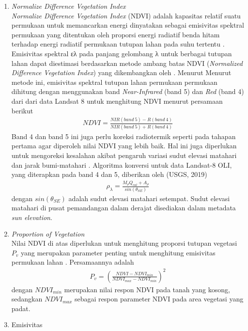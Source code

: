 \begin{enumerate}
	\vskip 5pt
	\item \textit{Normalize Difference Vegetation Index}\\
	\textit{Normalize Difference Vegetation Index} (NDVI) adalah kapasitas relatif suatu permukaan untuk memancarkan energi dinyatakan sebagai emisivitas spektral permukaan yang ditentukan oleh proporsi energi radiatif benda hitam terhadap energi radiatif permukaan tutupan lahan pada suhu tertentu \citep{Ogunode}. Emisivitas spektral ελ pada panjang gelombang λ untuk berbagai tutupan lahan dapat diestimasi berdasarkan metode ambang batas NDVI (\textit{Normalized Difference Vegetation Index}) yang dikembangkan oleh \citep{SobrinoandJimenezMunoz}. Menurut Menurut metode ini, emisivitas spektral tutupan lahan permukaan permukaan dihitung dengan menggunakan band \textit{Near-Infrared} (band 5) dan \textit{Red }(band 4) dari dari data Landsat 8 untuk menghitung NDVI menurut persamaan berikut
	\begin{align}
		NDVI = \frac{NIR(band\ 5)-R(band\ 4)}{NIR(band\ 5)+R(band\ 4)}
	\end{align}
	Band 4 dan band 5 ini juga perlu koreksi radiotermik seperti pada tahapan pertama agar diperoleh nilai NDVI yang lebih baik. Hal ini juga diperlukan untuk mengoreksi kesalahan akibat pengaruh variasi sudut elevasi matahari dan jarak bumi-matahari \citep{SekertekinArslan}. Algoritma konversi untuk data Landsat-8 OLI, yang diterapkan pada band 4 dan 5, diberikan oleh (USGS, 2019) 
	\begin{align}
		\rho_{\lambda}=\frac{M_{\rho}Q_{cal}+A_{\rho}}{sin(\theta_{SE})}
	\end{align}
	dengan $sin(\theta_{SE})$ adalah sudut elevasi matahari setempat. Sudut elevasi matahari di pusat pemandangan dalam derajat disediakan dalam metadata \textit{sun elevation}.
	\vskip 5pt
	\item \textit{Proportion of Vegetation}\\
	Nilai NDVI di atas diperlukan untuk menghitung proporsi tutupan vegetasi $P_v$ yang merupakan parameter penting untuk menghitung emisivitas permukaan lahan \citep{RouseHass}. Persamaannya adalah
	\begin{align}
		P_v = \left (\frac{NDVI-NDVI_{min}}{NDVI_{max}-NDVI_{min}}  \right )^2
	\end{align}
	dengan $NDVI_{min}$ merupakan nilai respon NDVI pada tanah yang kosong, sedangkan $NDVI_{max}$ sebagai respon parameter NDVI pada area vegetasi yang padat.
	\vskip 5pt	
	\item Emisivitas \\

\end{enumerate}

